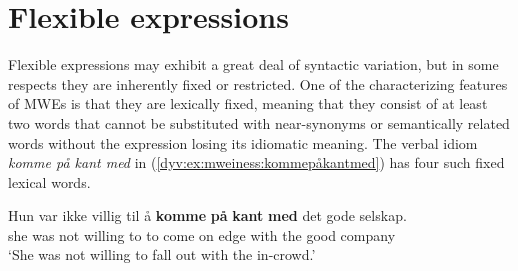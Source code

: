 \documentclass[output=paper]{langsci/langscibook}
\begin{document}

%
%
%
%
%
%
%


\section{Flexible expressions}\label{dyv:sec:mweiness:flexexp}

Flexible expressions may exhibit a great deal of syntactic variation, but in some respects they are inherently fixed or restricted.
One of the characterizing features of MWEs is that they are lexically fixed, meaning that they consist of at least two words that cannot be substituted with near-synonyms or semantically related words without the expression losing its idiomatic meaning.
The verbal idiom \emph{komme på kant med} in (\ref{dyv:ex:mweiness:kommepåkantmed}) has four such fixed lexical words.


\ea\label{dyv:ex:mweiness:kommepåkantmed}
\gll Hun var ikke villig til å \textbf{komme} \textbf{på} \textbf{kant} \textbf{med} det gode selskap. \\
     she was not willing to to come on edge with the good company \\
\glt `She was not willing to fall out with the in-crowd.’
\z
\end{document}

